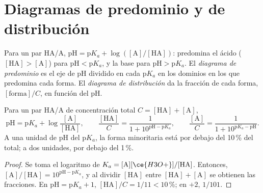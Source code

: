 \section{Diagramas de predominio y de distribución}

\begin{definition}\label{def:b1:predominant-reaction:predominance}
Para un par HA/A, $\mathrm{pH} = \mathrm{p}K_a + \log([\mathrm{A}]/[\mathrm{HA}])$:
predomina el ácido ($[\mathrm{HA}] > [\mathrm{A}]$) para
$\mathrm{pH} < \mathrm{p}K_a$, y la base para $\mathrm{pH} > \mathrm{p}K_a$.
El \emph{diagrama de predominio} es el eje
de pH dividido en cada $\mathrm{p}K_a$ en los dominios en los que
predomina cada forma. El \emph{diagrama de distribución}
da la fracción de cada forma, $[\text{forma}]/C$, en función del pH.
\end{definition}

\begin{proposition}\label{prop:b1:predominant-reaction:henderson}
Para un par HA/A de concentración total $C = [\mathrm{HA}] + [\mathrm{A}]$,
\[
  \mathrm{pH} = \mathrm{p}K_a + \log\frac{[\mathrm{A}]}{[\mathrm{HA}]}, \qquad
  \frac{[\mathrm{HA}]}{C} = \frac{1}{1 + 10^{\mathrm{pH} - \mathrm{p}K_a}}, \qquad
  \frac{[\mathrm{A}]}{C} = \frac{1}{1 + 10^{\mathrm{p}K_a - \mathrm{pH}}} .
\]
A una unidad de pH del $\mathrm{p}K_a$, la forma minoritaria está por
debajo del 10\,\% del total; a dos unidades, por debajo del 1\,\%.
\end{proposition}

\begin{proof}
Se toma el logaritmo de $K_a = [\mathrm{A}][\ce{H3O+}]/[\mathrm{HA}]$.
Entonces, $[\mathrm{A}]/[\mathrm{HA}] = 10^{\mathrm{pH}-\mathrm{p}K_a}$, y al
dividir $[\mathrm{HA}]$ entre $[\mathrm{HA}] + [\mathrm{A}]$ se obtienen
las fracciones. En
$\mathrm{pH} = \mathrm{p}K_a + 1$, $[\mathrm{HA}]/C = 1/11 < 10\,\%$; en
$+2$, $1/101$.
\end{proof}

